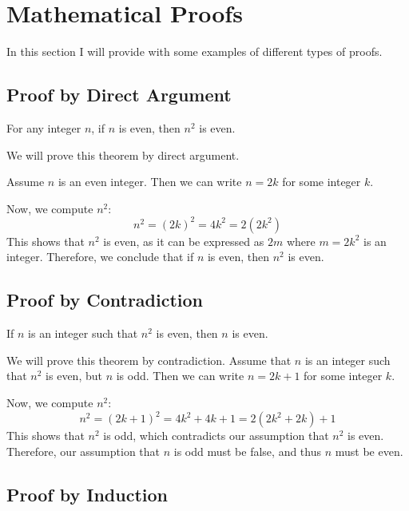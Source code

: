 \newpage
\section{Mathematical Proofs}

In this section I will provide with some examples of different types of proofs.

\subsection{Proof by Direct Argument}

For any integer \( n \), if \( n \) is even, then \( n^2 \) is even.
\vspace{\baselineskip}

We will prove this theorem by direct argument.
\vspace{\baselineskip}

Assume \( n \) is an even integer. Then we can write \( n = 2k \) for some integer \( k \).
\vspace{\baselineskip}

	Now, we compute \( n^2 \):
	\[
		n^2 = {(2k)}^2 = 4k^2 = 2(2k^2)
	\]
	This shows that \( n^2 \) is even, as it can be expressed as \( 2m \) where \( m = 2k^2 \) is an integer.
	Therefore, we conclude that if \( n \) is even, then \( n^2 \) is even.
\QED

\subsection{Proof by Contradiction}

If \( n \) is an integer such that \( n^2 \) is even, then \( n \) is even.
\vspace{\baselineskip}

We will prove this theorem by contradiction. Assume that \( n \) is an integer such that \( n^2 \) is even, but \( n \) is odd. Then we can write \( n = 2k + 1 \) for some integer \( k \).
\vspace{\baselineskip}

	Now, we compute \( n^2 \):
	\[
		n^2 = {(2k + 1)}^2 = 4k^2 + 4k + 1 = 2(2k^2 + 2k) + 1
	\]
	This shows that \( n^2 \) is odd, which contradicts our assumption that \( n^2 \) is even. Therefore, our assumption that \( n \) is odd must be false, and thus \( n \) must be even.
\QED

\subsection{Proof by Induction}

